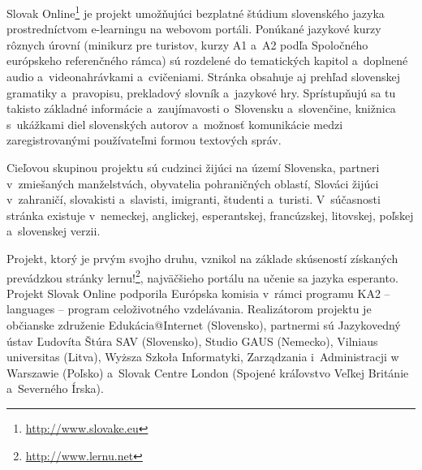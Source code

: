 \noindent Slovak Online\footnote{\url{http://www.slovake.eu}} je projekt umožňujúci bezplatné štúdium
slovenského jazyka prostredníctvom e-learningu na webovom portáli. Ponúkané jazykové
kurzy rôznych úrovní (minikurz pre turistov, kurzy A1 a~A2 podľa
Spoločného európskeho referenčného rámca) sú rozdelené do
tematických kapitol a~doplnené audio a~videonahrávkami a~cvičeniami.
Stránka obsahuje aj prehľad slovenskej gramatiky a~pravopisu,
prekladový slovník a~jazykové hry. Sprístupňujú sa tu takisto základné
informácie a~zaujímavosti o~Slovensku a~slovenčine, knižnica
s~ukážkami diel slovenských autorov a~možnosť komunikácie medzi
zaregistrovanými používateľmi formou textových správ.


Cieľovou skupinou projektu sú cudzinci žijúci na území Slovenska,
partneri v~zmiešaných manželstvách, obyvatelia pohraničných
oblastí, Slováci žijúci v~zahraničí, slovakisti a~slavisti,
imigranti, študenti a~turisti. V~súčasnosti stránka existuje
v~nemeckej, anglickej, esperantskej, francúzskej, litovskej, poľskej
a~slovenskej verzii.

Projekt, ktorý je prvým svojho druhu, vznikol na základe skúseností
získaných prevádzkou stránky
lernu!\footnote{\url{http://www.lernu.net}}, najväčšieho portálu na
učenie sa jazyka esperanto. Projekt Slovak Online podporila Európska
komisia v~rámci programu KA2 – languages – program celoživotného
vzdelávania. Realizátorom projektu je občianske združenie
Edukácia@Internet (Slovensko), partnermi sú Jazykovedný ústav
Ľudovíta Štúra SAV (Slovensko), Studio GAUS (Nemecko), Vilniaus
universitas (Litva), Wyższa Szkoła Informatyki, Zarządzania
i~Administracji w Warszawie (Poľsko) a~Slovak Centre London (Spojené
kráľovstvo Veľkej Británie a~Severného Írska).
